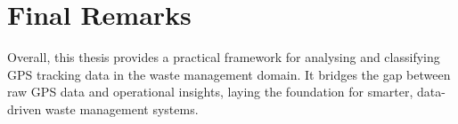 \documentclass[a4paper,12pt,twoside]{scrreprt}
\begin{document}
\section{Final Remarks}
Overall, this thesis provides a practical framework for analysing and
classifying GPS tracking data in the waste management domain. It bridges the
gap between raw GPS data and operational insights,
laying the foundation for smarter, data-driven waste management systems.

\clearpage
{}
{}
\printbibliography


\end{document}
